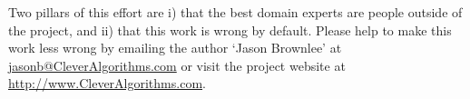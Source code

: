 \documentclass[a4paper, 11pt]{article}
\makeatletter
\newcommand{\myreportauthor}{Jason Brownlee}
\newcommand{\myreportemail}{jasonb@CleverAlgorithms.com}
\newcommand{\myreportwebsite}{http://www.CleverAlgorithms.com}
\makeatother
\begin{document}
Two pillars of this effort are i) that the best domain experts are people outside of the project, and ii) that this work is wrong by default. 
Please help to make this work less wrong by emailing the author `\myreportauthor' at \url{\myreportemail} or visit the project website at \url{\myreportwebsite}.



\end{document}
